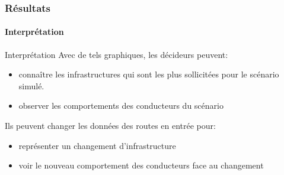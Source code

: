 \begin{frame}
    \frametitle{Résultats}
    \framesubtitle{Interprétation}

    \begin{block}{Interprétation}
        Avec de tels graphiques, les décideurs peuvent:
        \begin{itemize}
            \item connaître les infrastructures qui sont les plus sollicitées pour le scénario simulé.
            \item observer les comportements des conducteurs du scénario
        \end{itemize}

        Ils peuvent changer les données des routes en entrée pour:
        \begin{itemize}
            \item représenter un changement d'infrastructure
            \item voir le nouveau comportement des conducteurs face au changement
        \end{itemize}
    \end{block}
\end{frame}

